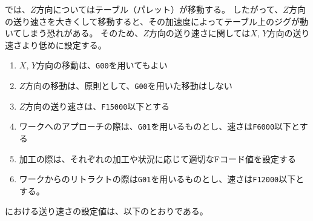 \DMname では、$Z$方向についてはテーブル（パレット）が移動する。
したがって、$Z$方向の送り速さを大きくして移動すると、その加速度によってテーブル上のジグが動いてしまう恐れがある。
そのため、$Z$方向の送り速さに関しては$X$, $Y$方向の送り速さより低めに設定する。
\begin{enumerate}[label=\Roman*., ref=\Roman*]
\item $X$, $Y$方向の移動は、\verb|G00|を用いてもよい
\item $Z$方向の移動は、原則として、\verb|G00|を用いた移動はしない
\item $Z$方向の送り速さは、\verb|F15000|以下とする
\item {}ワークへのアプローチの際は、\verb|G01|を用いるものとし、速さは\verb|F6000|以下とする
\item 加工の際は、それぞれの加工や状況に応じて適切なFコード値を設定する
\item ワークからのリトラクトの際は\verb|G01|を用いるものとし、速さは\verb|F12000|以下とする。
\end{enumerate}


\clearpage
\noindent
\dateKouguSpeed における送り速さの設定値は、以下のとおりである。\\


